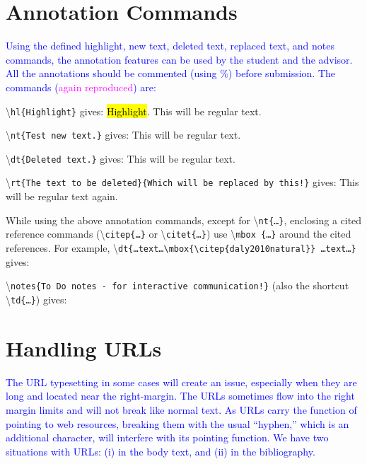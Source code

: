 \documentclass[phd]{ndsu-thesis-2022}
\newcommand\italk[1]{\textcolor{blue}{#1}}  %
\newcommand\cmd[1]{\textbackslash\texttt{#1}}  %
\begin{document}
\section{Annotation Commands}
\italk{Using the defined highlight, new text, deleted text, replaced text, and notes commands, the annotation features can be used by the student and the advisor. All the annotations should be commented (using \%) before submission. The commands (\textcolor{magenta}{again reproduced}) are:} 

\textbackslash\texttt{hl\{Highlight\}} gives: \hl{Highlight}. This will be regular text. 

\textbackslash\texttt{nt\{Test new text.\}} gives:  This will be regular text. 

\textbackslash\texttt{dt\{Deleted text.\}} gives:  This will be regular text. 

\textbackslash\texttt{rt\{The text to be deleted\}\{Which will be replaced by this!\}} gives:  This will be regular text again. 

\vspace{1.5ex}
While using the above annotation commands, except for \cmd{nt\{\ldots\}}, enclosing a cited reference commands (\cmd{citep\{\ldots\}} or \cmd{citet\{\ldots\}}) use \cmd{mbox
\{\ldots\}} around the cited references. For example, \cmd{dt\{\ldots text\ldots \cmd{mbox\{\cmd{citep\{daly2010natural\}}\}} \ldots text\ldots\}} 
gives:  

\vspace{1.5ex}
\textbackslash\texttt{notes\{To Do notes - for interactive communication!\}} (also the shortcut \\\cmd{td\{\ldots\}}) gives:  


\section{Handling URLs}
\italk{The URL typesetting in some cases will create an issue, especially when they are long and located near the right-margin. The URLs sometimes flow into the right margin limits and will not break like normal text. As URLs carry the function of pointing to web resources, breaking them with the usual ``hyphen,'' which is an additional character, will interfere with its pointing function. We have two situations with URLs: (i) in the body text, and (ii) in the bibliography.
} 
\end{document}
